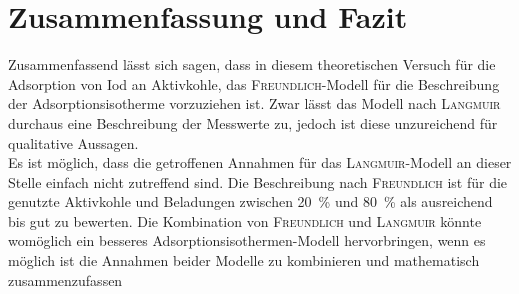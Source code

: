 \section{Zusammenfassung und Fazit}
\label{sec:zusammenfassung}

Zusammenfassend lässt sich sagen, dass in diesem theoretischen Versuch für die Adsorption von Iod an Aktivkohle, das \textsc{Freundlich}-Modell für die Beschreibung der Adsorptionsisotherme vorzuziehen ist. Zwar lässt das Modell nach \textsc{Langmuir} durchaus eine Beschreibung der Messwerte zu, jedoch ist diese unzureichend für qualitative Aussagen.\\

Es ist möglich, dass die getroffenen Annahmen für das \textsc{Langmuir}-Modell an dieser Stelle einfach nicht zutreffend sind. Die Beschreibung nach \textsc{Freundlich} ist für die genutzte Aktivkohle und Beladungen zwischen \SI{20}{\percent} und \SI{80}{\percent} als ausreichend bis gut zu bewerten. Die Kombination von \textsc{Freundlich} und \textsc{Langmuir} könnte womöglich ein besseres Adsorptionsisothermen-Modell hervorbringen, wenn es möglich ist die Annahmen beider Modelle zu kombinieren und mathematisch zusammenzufassen 